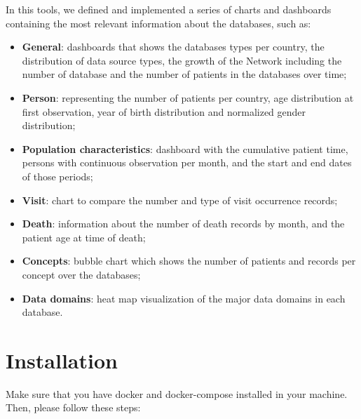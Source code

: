 \documentclass[]{book}
\providecommand{\tightlist}{%
  \setlength{\itemsep}{0pt}\setlength{\parskip}{0pt}}
\begin{document}
In this tools, we defined and implemented a series of charts and
dashboards containing the most relevant information about the databases,
such as:

\begin{itemize}
\tightlist
\item
  \textbf{General}: dashboards that shows the databases types per
  country, the distribution of data source types, the growth of the
  Network including the number of database and the number of patients in
  the databases over time;
\item
  \textbf{Person}: representing the number of patients per country, age
  distribution at first observation, year of birth distribution and
  normalized gender distribution;
\item
  \textbf{Population characteristics}: dashboard with the cumulative
  patient time, persons with continuous observation per month, and the
  start and end dates of those periods;
\item
  \textbf{Visit}: chart to compare the number and type of visit
  occurrence records;
\item
  \textbf{Death}: information about the number of death records by
  month, and the patient age at time of death;
\item
  \textbf{Concepts}: bubble chart which shows the number of patients and
  records per concept over the databases;
\item
  \textbf{Data domains}: heat map visualization of the major data
  domains in each database.
\end{itemize}

\chapter{Installation}\label{installation}

Make sure that you have docker and docker-compose installed in your
machine. Then, please follow these steps:
\end{document}
